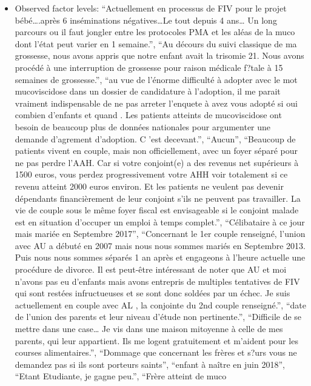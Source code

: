 \documentclass[
  letterpaper,
  DIV=11,
  numbers=noendperiod]{scrartcl}
\providecommand{\tightlist}{%
  \setlength{\itemsep}{0pt}\setlength{\parskip}{0pt}}
\begin{document}
\begin{itemize}
\tightlist
\item
  Observed factor levels: ``Actuellement en processus de FIV pour le
  projet bébé\ldots.après 6 inséminations négatives\ldots Le tout depuis
  4 ans\ldots{} Un long parcours ou il faut jongler entre les protocoles
  PMA et les aléas de la muco dont l'état peut varier en 1 semaine.'',
  ``Au décours du suivi classique de ma grossesse, nous avons appris que
  notre enfant avait la trisomie 21. Nous avons procédé à une
  interruption de grossesse pour raison médicale f?tale à 15 semaines de
  grossesse.'', ``au vue de l'énorme difficulté à adopter avec le mot
  mucoviscidose dans un dossier de candidature à l'adoption, il me
  parait vraiment indispensable de ne pas arreter l'enquete à avez vous
  adopté si oui combien d'enfants et quand . Les patients atteints de
  mucoviscidose ont besoin de beaucoup plus de données nationales pour
  argumenter une demande d'agrement d'adoption. C 'est decevant.'',
  ``Aucun'', ``Beaucoup de patients vivent en couple, mais non
  officiellement, avec un foyer séparé pour ne pas perdre l'AAH. Car si
  votre conjoint(e) a des revenus net supérieurs à 1500 euros, vous
  perdez progressivement votre AHH voir totalement si ce revenu atteint
  2000 euros environ. Et les patients ne veulent pas devenir dépendants
  financièrement de leur conjoint s'ils ne peuvent pas travailler. La
  vie de couple sous le même foyer fiscal est envisageable si le
  conjoint malade est en situation d'occuper un emploi à temps
  complet.'', ``Célibataire à ce jour mais mariée en Septembre 2017'',
  ``Concernant le 1er couple renseigné, l'union avec AU a débuté en 2007
  mais nous nous sommes mariés en Septembre 2013. Puis nous nous sommes
  séparés 1 an après et engageons à l'heure actuelle une procédure de
  divorce. Il est peut-être intéressant de noter que AU et moi n'avons
  pas eu d'enfants mais avons entrepris de multiples tentatives de FIV
  qui sont restées infructueuses et se sont donc soldées par un échec.
  Je suis actuellement en couple avec AL , la conjointe du 2nd couple
  renseigné.'', ``date de l'union des parents et leur niveau d'étude non
  pertinente.'', ``Difficile de se mettre dans une case\ldots{} Je vis
  dans une maison mitoyenne à celle de mes parents, qui leur appartient.
  Ils me logent gratuitement et m'aident pour les courses
  alimentaires.'', ``Dommage que concernant les frères et s?urs vous ne
  demandez pas si ils sont porteurs saints'', ``enfant à naître en juin
  2018'', ``Etant Etudiante, je gagne peu.'', ``Frère atteint de muco

\end{itemize}
\end{document}
